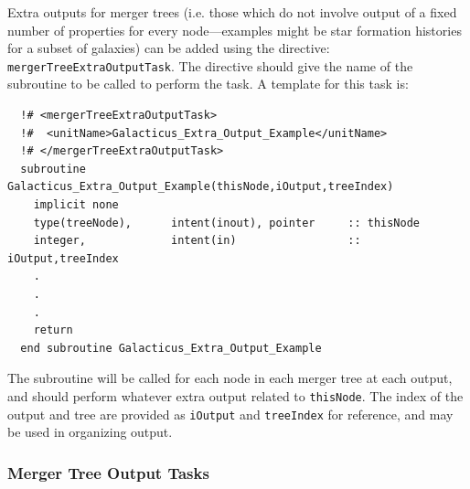 Extra outputs for merger trees (i.e. those which do not involve output of a fixed number of properties for every node---examples might be star formation histories for a subset of galaxies) can be added using the directive: {\tt mergerTreeExtraOutputTask}. The directive should give the name of the subroutine to be called to perform the task. A template for this task is:
\begin{verbatim}
  !# <mergerTreeExtraOutputTask>
  !#  <unitName>Galacticus_Extra_Output_Example</unitName>
  !# </mergerTreeExtraOutputTask>
  subroutine Galacticus_Extra_Output_Example(thisNode,iOutput,treeIndex)
    implicit none
    type(treeNode),      intent(inout), pointer     :: thisNode
    integer,             intent(in)                 :: iOutput,treeIndex
    .
    .
    .
    return
  end subroutine Galacticus_Extra_Output_Example
\end{verbatim}
The subroutine will be called for each node in each merger tree at each output, and should perform whatever extra output related to {\tt thisNode}. The index of the output and tree are provided as {\tt iOutput} and {\tt treeIndex} for reference, and may be used in organizing output.

\subsubsection{Merger Tree Output Tasks}

